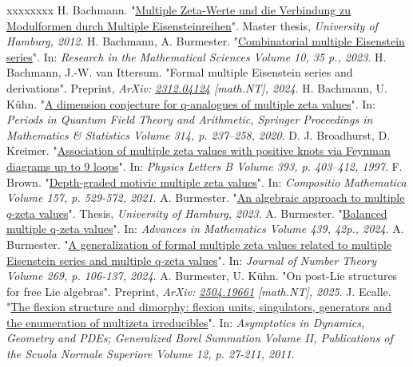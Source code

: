 \documentclass[12pt,reqno]{amsart}
\numberwithin{equation}{section}
\theoremstyle{definition}
\begin{document}
\begin{thebibliography}{xxxxxxxx}
 H. Bachmann. "\href{https://www.henrikbachmann.com/uploads/7/7/6/3/77634444/msc_henrik_bachmann.pdf}{Multiple Zeta-Werte und die Verbindung zu Modulformen durch Multiple Eisensteinreihen}". Master thesis, \textit{University of Hamburg, 2012}.
 H. Bachmann, A. Burmester. "\href{https://link.springer.com/article/10.1007/s40687-023-00398-8}{Combinatorial multiple Eisenstein series}". In: \textit{Research in the Mathematical Sciences Volume 10, 35 p., 2023}.
 H. Bachmann, J.-W. van Ittersum. "Formal multiple Eisenstein series and derivations". Preprint, \textit{ArXiv: \href{https://arxiv.org/abs/2312.04124}{2312.04124} [math.NT], 2024}.
 H. Bachmann, U. K\"uhn. "\href{https://arxiv.org/abs/1708.07464}{A dimension conjecture for q-analogues of multiple zeta values}". In: \textit{Periods in Quantum Field Theory and Arithmetic, Springer Proceedings in Mathematics \& Statistics Volume 314, p. 237–258, 2020}.
 D. J. Broadhurst, D. Kreimer. "\href{https://arxiv.org/abs/hep-th/9609128}{Association of multiple zeta values with positive knots via Feynman diagrams up to 9 loops}". In: \textit{Physics Letters B Volume 393, p. 403–412, 1997}.
 F. Brown. "\href{https://arxiv.org/abs/1301.3053}{Depth-graded motivic multiple zeta values}". In: \textit{Compositio Mathematica Volume 157, p. 529-572, 2021}.
 A. Burmester. "\href{https://www.dropbox.com/s/dl/n1rciwtablotxhz/thesis_burmester_final.pdf}{An algebraic approach to multiple $q$-zeta values}". Thesis, \textit{University of Hamburg, 2023}.
 A. Burmester. "\href{https://www.sciencedirect.com/science/article/pii/S0001870824000021?via=ihub}{Balanced multiple q-zeta values}". In: \textit{Advances in Mathematics Volume 439, 42p., 2024}.
 A. Burmester. "\href{https://www.sciencedirect.com/science/article/pii/S0022314X24002221?via\%3Dihub}{A generalization of formal multiple zeta values related to multiple Eisenstein series and multiple q-zeta values}". In: \textit{Journal of Number Theory Volume 269, p. 106-137, 2024}.
 A. Burmester, U. Kühn. "On post-Lie structures for free Lie algebras". Preprint, \textit{ArXiv: \href{https://arxiv.org/abs/2504.19661}{2504.19661} [math.NT], 2025}.
 J. Ecalle. "\href{https://www.imo.universite-paris-saclay.fr/~jean.ecalle/fichiersweb/WEB_flexions_1.pdf}{The flexion structure and dimorphy: flexion units, singulators, generators and the enumeration of multizeta irreducibles}". In: \textit{Asymptotics in Dynamics, Geometry and PDEs; Generalized Borel Summation Volume II, Publications of the Scuola Normale Superiore Volume 12, p. 27-211, 2011}.

\end{thebibliography}
\end{document}
